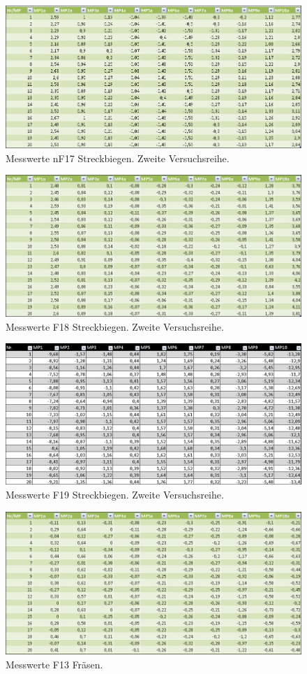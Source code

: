 \begin{figure}[H]
\centering
\includegraphics[width=.8\textwidth]{nF17Bieg}
\caption{Messwerte nF17 Streckbiegen. Zweite Versuchsreihe.}
\label{nF17Bieg}
\end{figure}
\begin{figure}[H]
\centering
\includegraphics[width=.8\textwidth]{F18Bieg}
\caption{Messwerte F18 Streckbiegen. Zweite Versuchsreihe.}
\label{F18Bieg}
\end{figure}
\begin{figure}[H]
\centering
\includegraphics[width=.8\textwidth]{F19Bieg}
\caption{Messwerte F19 Streckbiegen. Zweite Versuchsreihe.}
\label{F19Bieg}
\end{figure}
\begin{figure}[H]
\centering
\includegraphics[width=.8\textwidth]{F13fraes}
\caption{Messwerte F13 Fräsen.}
\label{F13fraes}
\end{figure}
